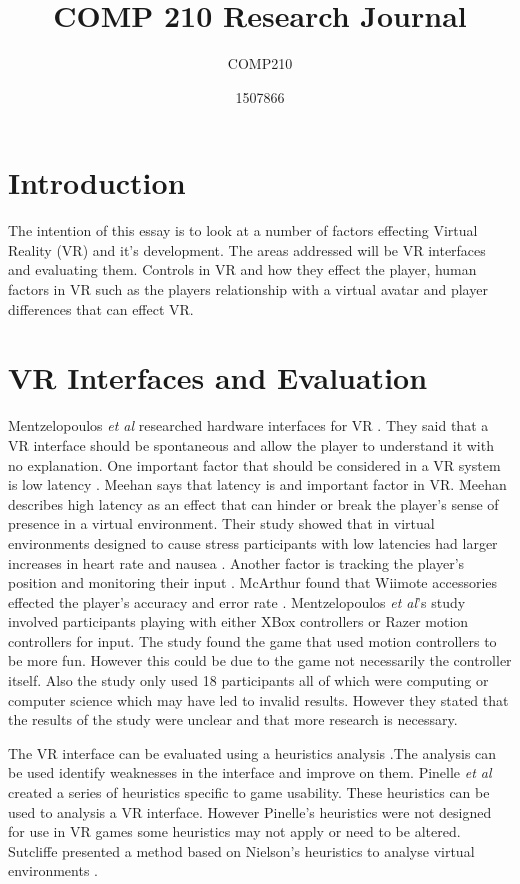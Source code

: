 \documentclass{scrartcl}
\title{COMP 210 Research Journal}
\subtitle{COMP210}
\author{1507866}
\begin{document}
	
\maketitle
	

\section{Introduction}
The intention of this essay is to look at a number of factors effecting Virtual Reality (VR) and it's development. The areas addressed will be VR interfaces and evaluating them. Controls in VR and how they effect the player, human factors in VR such as the players relationship with a virtual avatar and player differences that can effect VR.
	
\section{VR Interfaces and Evaluation}
Mentzelopoulos \textit{et al} researched hardware interfaces for VR \cite{Mentzelopoulos}. They said that a VR interface should be spontaneous and allow the player to understand it with no explanation.
One important factor that should be considered in a VR system is low latency \cite{Mentzelopoulos, Meehan}. 
 Meehan says that latency is and important factor in VR. Meehan describes high latency as an effect that can hinder or break the player's sense of presence in a virtual environment. Their study showed that in virtual environments designed to cause stress participants with low latencies had larger increases in heart rate and nausea \cite{Meehan}.
Another factor is tracking the player's position and monitoring their input \cite{Mentzelopoulos}. McArthur found that Wiimote accessories effected the player's accuracy and error rate \cite{McArthur}.
Mentzelopoulos \textit{et al}'s study involved participants playing with either XBox controllers or Razer motion controllers for input. The study found the game that used motion controllers to be more fun. However this could be due to the game not necessarily the controller itself. Also the study only used 18 participants all of which were computing or computer science which may have led to invalid results. However they stated that the results of the study were unclear and that more research is necessary. 


The VR interface can be evaluated using a heuristics analysis \cite{Nielsen, Pinelle}.The analysis can be used identify weaknesses in the interface and improve on them. Pinelle \textit{et al} created a series of heuristics specific to game usability. These heuristics can be used to analysis a VR interface. However Pinelle's heuristics were not designed for use in VR games some heuristics may not apply or need to be altered.  Sutcliffe presented a method based on Nielson's heuristics to analyse virtual environments \cite{sutcliffe2004heuristic}.
\end{document}
